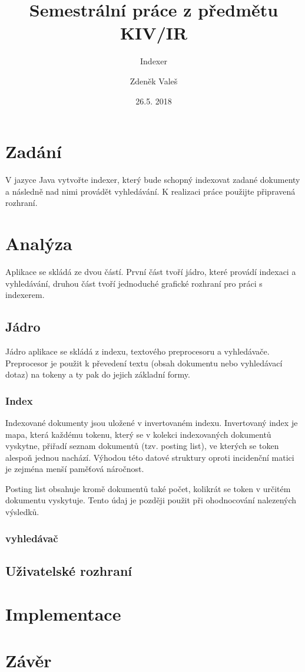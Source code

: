 \documentclass[11pt,a4paper]{scrartcl}
\begin{document}
	\title{Semestrální práce z předmětu KIV/IR}
	\subtitle{Indexer}
	\author{Zdeněk Valeš}
	\date{26.5. 2018}
	\maketitle
	\newpage
	
	\section{Zadání}
	V jazyce Java vytvořte indexer, který bude schopný indexovat zadané dokumenty a následně nad nimi provádět vyhledávání. K realizaci práce použijte připravená rozhraní.
	
	\section{Analýza}
	Aplikace se skládá ze dvou částí. První část tvoří jádro, které provádí indexaci a vyhledávání, druhou část tvoří jednoduché grafické rozhraní pro práci s indexerem.
	
	\subsection{Jádro}
	Jádro aplikace se skládá z indexu, textového preprocesoru  a vyhledávače. Preprocesor je použit k převedení textu (obsah dokumentu nebo vyhledávací dotaz) na tokeny a ty pak do jejich základní formy.
	
	\subsubsection{Index}
	Indexované dokumenty jsou uložené v invertovaném indexu. Invertovaný index je mapa, která každému tokenu, který se v kolekci indexovaných dokumentů vyskytne, přiřadí seznam dokumentů (tzv. posting list), ve kterých se token alespoň jednou nachází. Výhodou této datové struktury oproti incidenční matici je zejména menší paměťová náročnost.
	
	Posting list obsahuje kromě dokumentů také počet, kolikrát se token v určitém dokumentu vyskytuje. Tento údaj je později použit při ohodnocování nalezených výsledků.
	
	
	
	\subsubsection{vyhledávač}
	
	
	
	\subsection{Uživatelské rozhraní}
	
	\section{Implementace}
	
	
	\section{Závěr}
	
\end{document}
